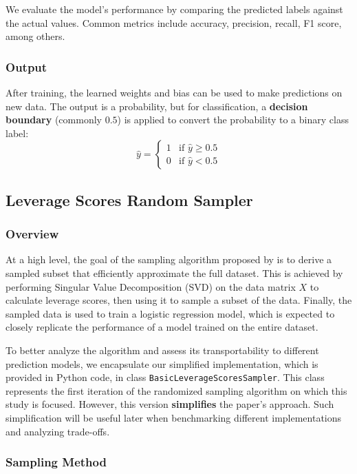 \documentclass{article}
\theoremstyle{plain}
\theoremstyle{definition}
\theoremstyle{remark}
\begin{document}
We evaluate the model’s performance by comparing the predicted labels against the actual values. Common metrics include accuracy, precision, recall, F1 score, among others.


\subsubsection{Output}

After training, the learned weights and bias can be used to make predictions on new data. The output is a probability, but for classification, a \textbf{decision boundary} (commonly $0.5$) is applied to convert the probability to a binary class label:
$$
\hat{y} = \begin{cases}
1 & \text{if } \hat{y} \geq 0.5 \\
0 & \text{if } \hat{y} < 0.5
\end{cases}
$$


\subsection{Leverage Scores Random Sampler}

\subsubsection{Overview}

At a high level, the goal of the sampling algorithm proposed by \citeauthor{chow24} is to derive a sampled subset that efficiently approximate the full dataset. This is achieved by performing Singular Value Decomposition (SVD) on the data matrix $X$ to calculate leverage scores, then using it to sample a subset of the data. Finally, the sampled data is used to train a logistic regression model, which is expected to closely replicate the performance of a model trained on the entire dataset.

To better analyze the algorithm and assess its transportability to different prediction models, we encapsulate our simplified implementation, which is provided in Python code, in class \texttt{BasicLeverageScoresSampler}. This class represents the first iteration of the randomized sampling algorithm on which this study is focused. However, this version \textbf{simplifies} the paper's approach. Such simplification will be useful later when benchmarking different implementations and analyzing trade-offs.


\subsubsection{Sampling Method}
\end{document}
